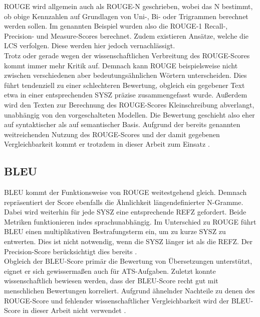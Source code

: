 \noindent
\ac{ROUGE} wird allgemein auch als \ac{ROUGE}-N geschrieben, wobei das N bestimmt, ob obige Kennzahlen auf Grundlagen von Uni-, Bi- oder Trigrammen berechnet werden sollen. Im genannten Beispiel wurden also die \ac{ROUGE}-1 Recall-, Precision- und Measure-Scores berechnet. Zudem existieren Ansätze, welche die \ac{LCS} verfolgen. Diese werden hier jedoch vernachlässigt.\\

\noindent
Trotz oder gerade wegen der wissenschaftlichen Verbreitung des \ac{ROUGE}-Scores kommt immer mehr Kritik auf. Demnach kann \ac{ROUGE} beispielsweise nicht zwischen verschiedenen aber bedeutungsähnlichen Wörtern unterscheiden. Dies führt tendenziell zu einer schlechteren Bewertung, obgleich ein gegebener Text etwa in einer entsprechenden \ac{SYSZ} präzise zusammengefasst wurde. Außerdem wird den Texten zur Berechnung des \ac{ROUGE}-Scores Kleinschreibung abverlangt, unabhängig von den vorgeschalteten Modellen. Die Bewertung geschieht also eher auf syntaktischer als auf semantischer Basis. Aufgrund der bereits genannten weitreichenden Nutzung des \ac{ROUGE}-Scores und der damit gegebenen Vergleichbarkeit kommt er trotzdem in dieser Arbeit zum Einsatz \cite[S.~5]{LIN04}.

	
\subsection{BLEU}
\noindent
\ac{BLEU} kommt der Funktionsweise von \ac{ROUGE} weitestgehend gleich. Demnach repräsentiert der Score ebenfalls die Ähnlichkeit längendefinierter N-Gramme. Dabei wird weiterhin für jede \ac{SYSZ} eine entsprechende \ac{REFZ} gefordert. Beide Metriken funktionieren indes sprachunabhängig. Im Unterschied zu \ac{ROUGE} führt \ac{BLEU} einen multiplikativen Bestrafungsterm ein, um zu kurze \ac{SYSZ} zu entwerten. Dies ist nicht notwendig, wenn die \ac{SYSZ} länger ist als die \ac{REFZ}. Der Precision-Score berücksichtigt dies bereits \cite[S.~5]{PAP02}.\\

\noindent
Obgleich der \ac{BLEU}-Score primär die Bewertung von Übersetzungen unterstützt, eignet er sich gewissermaßen auch für \ac{ATS}-Aufgaben. Zuletzt konnte wissenschaftlich bewiesen werden, dass der \ac{BLEU}-Score recht gut mit menschlichen Bewertungen korreliert. Aufgrund ähnelnder Nachteile zu denen des \ac{ROUGE}-Score und fehlender wissenschaftlicher Vergleichbarkeit wird der \ac{BLEU}-Score in dieser Arbeit nicht verwendet \cite[S.~6-7]{PAP02}.
